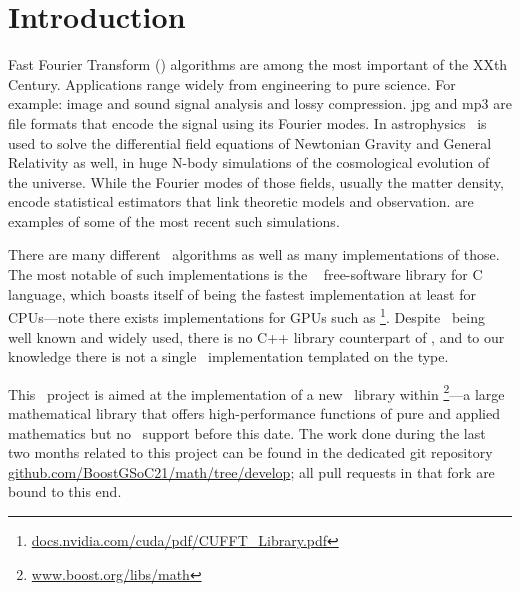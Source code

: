 \section{Introduction}

Fast Fourier Transform (\fft) algorithms are among the most important of the XXth
Century. Applications range widely from engineering to pure science.
For example: image and sound signal analysis and lossy compression.
jpg and mp3 are file formats that encode the signal using its Fourier modes.
In astrophysics \fft\ is used to solve the differential field
equations of Newtonian Gravity and General Relativity as well, in huge N-body
simulations of the cosmological evolution of the universe. While the Fourier
modes of those fields, usually the matter density, encode statistical estimators
that link theoretic models and observation. \cite{adamek_2016,springel_2020} are
examples of some of the most recent such simulations.

There are many different \fft\ algorithms as well as many implementations of
those. The most notable of such implementations is the \fftw\ \cite{FFTW05}
free-software library for C language, which boasts itself of being the fastest
implementation at least for CPUs---note there exists 
implementations for GPUs such as
\cufft\footnote{\url{docs.nvidia.com/cuda/pdf/CUFFT_Library.pdf}}.
Despite \fft\ being well known and widely used, there is no C++ library 
counterpart of \fftw,
and to our knowledge there is not a single \fft\ implementation templated on the
type.

This \gsoc\ project is aimed at the implementation of a new \fft\ library
within \boostmath\footnote{\url{www.boost.org/libs/math}}---a large mathematical
library that
offers high-performance functions of pure and applied mathematics
but no \fft\ support before this date. 
The work done during the last two months related to this project
can be found in the dedicated git
repository \url{github.com/BoostGSoC21/math/tree/develop}; all pull requests
in that fork are bound to this end.
